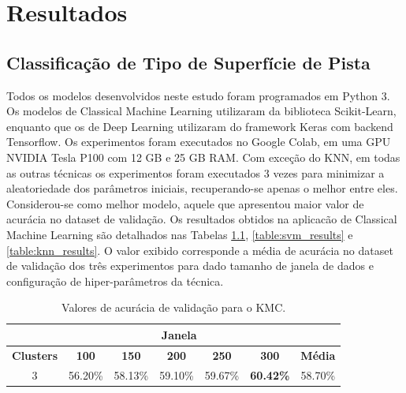 \chapter{Resultados}
\label{cap:resultados}

\section{Classificação de Tipo de Superfície de Pista}

Todos os modelos desenvolvidos neste estudo foram programados em Python 3. Os modelos de Classical Machine Learning utilizaram da biblioteca Scikit-Learn, enquanto que os de Deep Learning utilizaram do framework Keras com backend Tensorflow. Os experimentos foram executados no Google Colab, em uma GPU NVIDIA Tesla P100 com 12 GB e 25 GB RAM. Com exceção do KNN, em todas as outras técnicas os experimentos foram executados 3 vezes para minimizar a aleatoriedade dos parâmetros iniciais, recuperando-se apenas o melhor entre eles. Considerou-se como melhor modelo, aquele que apresentou maior valor de acurácia no dataset de validação. Os resultados obtidos na aplicacão de Classical Machine Learning são detalhados nas Tabelas \ref{table:kmc_results}, \ref{table:svm_results} e \ref{table:knn_results}. O valor exibido corresponde a média de acurácia no dataset de validação dos três experimentos para dado tamanho de janela de dados e configuração de hiper-parâmetros da técnica.

\begin{table}[h!]
\caption{Valores de acurácia de validação para o KMC.} 
\label{table:kmc_results}
\centering
\small
\begin{tabular}{ccccccc}
\cmidrule(l){2-6}
\textbf{} & \multicolumn{5}{c}{\textbf{Janela}} \\ \midrule
\textbf{Clusters} & \textbf{100} & \textbf{150} & \textbf{200} & \textbf{250} & \textbf{300} & \textbf{Média} \\ \midrule
3 & 56.20\% & 58.13\% & 59.10\% & 59.67\% & \textbf{60.42\%} & 58.70\% \\ \bottomrule
\end{tabular}
\end{table}


